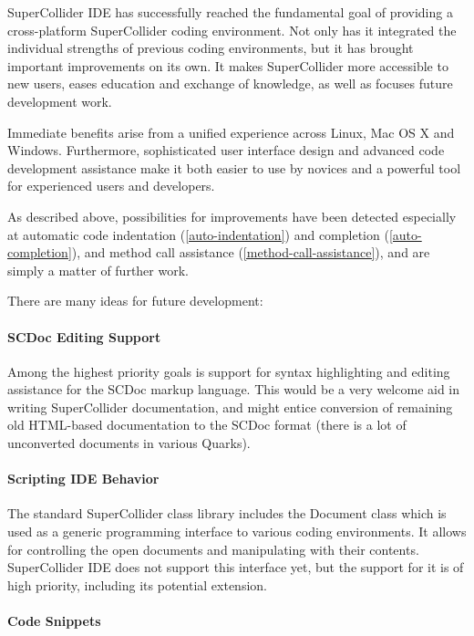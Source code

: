 \documentclass[11pt,a4paper]{article}
\begin{document}
SuperCollider IDE has successfully reached the fundamental goal of providing a cross-platform SuperCollider coding
environment. Not only has it integrated the individual strengths of previous coding environments, but it has brought
important improvements on its own. It makes SuperCollider more accessible to new users, eases education and exchange of
knowledge, as well as focuses future development work.

Immediate benefits arise from a unified experience across Linux, Mac OS X and Windows. Furthermore, sophisticated user
interface design and advanced code development assistance make it both easier to use by novices and a powerful tool for
experienced users and developers.

As described above, possibilities for improvements have been detected especially at automatic code indentation
(\ref{auto-indentation}) and completion (\ref{auto-completion}), and method call assistance
(\ref{method-call-assistance}), and are simply a matter of further work.

There are many ideas for future development:

\paragraph{SCDoc Editing Support} \hfill

Among the highest priority goals is support for syntax highlighting and editing assistance for the SCDoc markup
language. This would be a very welcome aid in writing SuperCollider documentation, and might entice conversion of
remaining old HTML-based documentation to the SCDoc format (there is a lot of unconverted documents in various Quarks).

\paragraph{Scripting IDE Behavior} \hfill

The standard SuperCollider class library includes the Document class which is used as a generic programming interface to
various coding environments. It allows for controlling the open documents and manipulating with their contents.
SuperCollider IDE does not support this interface yet, but the support for it is of high priority, including its
potential extension.

\paragraph{Code Snippets} \hfill
\end{document}
